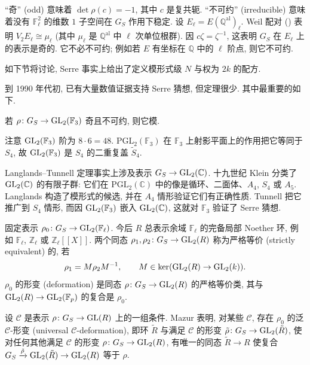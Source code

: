 ``奇'' (odd) 意味着 $\det\rho(c) = -1$, 其中 $c$ 是复共轭. ``不可约'' (irreducible) 意味着没有 $\mathbb{F}_\ell^2$ 的维数 $1$ 子空间在 $G_S$ 作用下稳定. 设 $E_\ell = E(\mathbb{Q}^{\mathrm{al}})_{\ell}$. Weil 配对 (\cite[III, 8]{silverman2009}) 表明 $V_2 E_\ell\cong\mu_\ell$ (其中 $\mu_\ell$ 是 $\mathbb{Q}^{\mathrm{al}}$ 中 $\ell$ 次单位根群). 因 $c\zeta = \zeta^{-1}$, 这表明 $G_S$ 在 $E_\ell$ 上的表示是奇的. 它不必不可约; 例如若 $E$ 有坐标在 $\mathbb{Q}$ 中的 $\ell$ 阶点, 则它不可约.

如下节将讨论, Serre 事实上给出了定义模形式级 $N$ 与权为 $2k$ 的配方.

到 1990 年代初, 已有大量数值证据支持 Serre 猜想, 但定理很少. 其中最重要的如下.

\begin{theorem} \label{thm:5.8.6} 
若 $\rho\colon G_S\to\operatorname{GL}_2(\mathbb{F}_3)$ 奇且不可约, 则它模.
\end{theorem}

注意 $\operatorname{GL}_2(\mathbb{F}_3)$ 阶为 $8\cdot 6 = 48$. $\mathrm{PGL}_2(\mathbb{F}_3)$ 在 $\mathbb{F}_3$ 上射影平面上的作用把它等同于 $S_4$, 故 $\operatorname{GL}_2(\mathbb{F}_3)$ 是 $S_4$ 的二重复盖 $\tilde{S}_4$.

Langlands--Tunnell 定理事实上涉及表示 $G_S\to\operatorname{GL}_2(\mathbb{C})$. 十九世纪 Klein 分类了 $\operatorname{GL}_2(\mathbb{C})$ 的有限子群: 它们在 $\mathrm{PGL}_2(\mathbb{C})$ 中的像是循环、二面体、$A_4$, $S_4$ 或 $A_5$. Langlands 构造了模形式的候选, 并在 $A_4$ 情形验证它们有正确性质. Tunnell 把它推广到 $S_4$ 情形, 而因 $\operatorname{GL}_2(\mathbb{F}_3)$ 嵌入 $\operatorname{GL}_2(\mathbb{C})$, 这就对 $\mathbb{F}_3$ 验证了 Serre 猜想.

固定表示 $\rho_0\colon G_S\to\operatorname{GL}_2(\mathbb{F}_\ell)$. 今后 $R$ 总表示余域 $\mathbb{F}_\ell$ 的完备局部 Noether 环, 例如 $\mathbb{F}_\ell$, $\mathbb{Z}_\ell$ 或 $\mathbb{Z}_\ell[[X]]$. 两个同态 $\rho_1, \rho_2\colon G_S\to\operatorname{GL}_2(R)$ 称为严格等价 (strictly equivalent) 的, 若
\[
\rho_1 = M\rho_2M^{-1}, \qquad M\in\ker(\operatorname{GL}_2(R)\to\operatorname{GL}_2(k)).
\]
$\rho_0$ 的形变 (deformation) 是同态 $\rho\colon G_S\to\operatorname{GL}_2(R)$ 的严格等价类, 其与 $\operatorname{GL}_2(R)\to\operatorname{GL}_2(\mathbb{F}_p)$ 的复合是 $\rho_0$.

设 $\mathcal{C}$ 是表示 $\rho\colon G_S\to\operatorname{GL}(R)$ 上的一组条件. Mazur 表明, 对某些 $\mathcal{C}$, 存在 $\rho_0$ 的泛 $\mathcal{C}$-形变 (universal $\mathcal{C}$-deformation), 即环 $\tilde{R}$ 与满足 $\mathcal{C}$ 的形变 $\tilde{\rho}\colon G_S\to\operatorname{GL}_2(\tilde{R})$, 使对任何其他满足 $\mathcal{C}$ 的形变 $\rho\colon G_S\to\operatorname{GL}_2(R)$, 有唯一的同态 $\tilde{R}\to R$ 使复合 $G_S\xrightarrow{\tilde{\rho}}\operatorname{GL}_2(\tilde{R})\to\operatorname{GL}_2(R)$ 等于 $\rho$.

